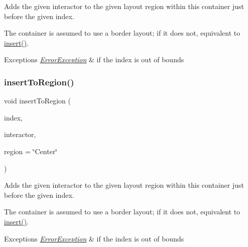 Adds the given interactor to the given layout region within this container just before the given index. 

The container is assumed to use a border layout; if it does not, equivalent to \mbox{\hyperlink{classGContainer_afffb8f789ff9a8466fbae5b846a0ebe7}{insert()}}. 
\begin{DoxyExceptions}{Exceptions}
{\em \mbox{\hyperlink{classErrorException}{Error\+Exception}}} & if the index is out of bounds \\
\hline
\end{DoxyExceptions}
\mbox{\label{classGContainer_ad4d413f64a3e4fb948956e7249c10110}} 
\subsubsection{\texorpdfstring{insert\+To\+Region()}{insertToRegion()}\hspace{0.1cm}{\footnotesize\ttfamily [4/4]}}
{\footnotesize\ttfamily void insert\+To\+Region (\begin{DoxyParamCaption}\item[{int}]{index,  }\item[{\mbox{\hyperlink{classGInteractor}{G\+Interactor}} \&}]{interactor,  }\item[{const std\+::string \&}]{region = {\ttfamily \char`\"{}Center\char`\"{}} }\end{DoxyParamCaption})\hspace{0.3cm}{\ttfamily [virtual]}}



Adds the given interactor to the given layout region within this container just before the given index. 

The container is assumed to use a border layout; if it does not, equivalent to \mbox{\hyperlink{classGContainer_afffb8f789ff9a8466fbae5b846a0ebe7}{insert()}}. 
\begin{DoxyExceptions}{Exceptions}
{\em \mbox{\hyperlink{classErrorException}{Error\+Exception}}} & if the index is out of bounds \\
\hline
\end{DoxyExceptions}
\mbox{\label{classGObservable_aeec1adc19aa0f33de62390686ee1382c}} 
